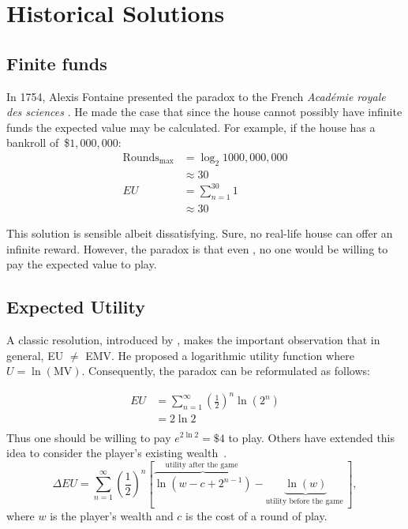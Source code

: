 \documentclass[11pt]{article}
\begin{document}
\section{Historical Solutions}
\subsection{Finite funds}
In 1754, Alexis Fontaine presented the paradox to the French \textit{Académie royale des sciences} \parencite[429]{des1764memoires}. He made the case that since the house cannot possibly have infinite funds the expected value may be calculated. For example, if the house has a bankroll of~\$$1,000,000$:
\nopagebreak
\begin{align*}
  \text{Rounds}_{\text{max}} &= \log_2{1000,000,000} \\
                             &\approx 30 \\
                          EU &= \sum_{n=1}^{30}1 \\
                             &\approx 30
\end{align*}


This solution is sensible albeit dissatisfying. Sure, no real-life house can offer an infinite reward. However, the paradox is that even , no one would be willing to pay the expected value to play.

\subsection{Expected Utility}
A classic resolution, introduced by \textcite{risk1954exposition}, makes the important observation that in general, EU $\ne$ EMV. He proposed a logarithmic utility function where $U=\ln(\mathrm{MV})$. Consequently, the paradox can be reformulated as follows:

\begin{align*}
  EU &= \sum_{n=1}^{\infty}\left(\frac{1}{2}\right)^n\ln\left(2^n\right) \\
     &= 2\ln 2 \\
\end{align*}
Thus one should be willing to pay $e^{2\ln 2}=\$4$ to play. Others have extended this idea to consider the player's existing wealth~\parencite{petersTimeResolutionSt2011}. 
\[
  \Delta EU=\sum_{n=1}^{\infty}\left(\frac{1}{2}\right)^{n}\left[\overbrace{\ln \left(w-c+2^{n-1}\right)}^{\text {utility after the game }}-\underbrace{\ln (w)}_{\text {utility before the game }}\right],
\]
where $w$ is the player's wealth and $c$ is the cost of a round of play.
\end{document}

